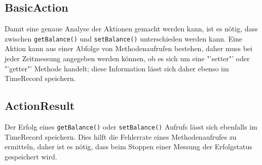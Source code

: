 \subsection{BasicAction}
\label{sec:BasicAction}
Damit eine genaue Analyse der Aktionen ge\-macht werden kann, ist es nö\-tig, dass zwi\-schen \verb+getBalance()+ und \verb+setBalance()+ un\-ter\-schieden wer\-den kann. Eine Aktion kann aus einer Abfolge von Methoden\-auf\-rufen bestehen, daher muss bei jeder Zeitmessung angegeben werden können, ob es sich um eine "'setter"' oder "'getter"' Methode handelt; diese Information lässt sich daher ebenso im TimeRecord speichern.

\subsection{ActionResult}
\label{sec:ActionResult}
Der Erfolg eines \verb+getBalance()+ oder \verb+setBalance()+ Aufrufs lässt sich ebenfalls im TimeRecord speichern. Dies hilft die Fehlerrate eines Methodenaufrufes zu ermitteln, daher ist es nötig, dass beim Stoppen einer Messung der Erfolgstatus gespeichert wird.





